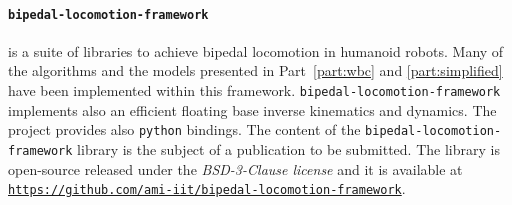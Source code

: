 \paragraph{\texttt{bipedal-locomotion-framework}} is a suite of libraries to achieve bipedal locomotion in humanoid robots. Many of the algorithms and the models presented in Part~\ref{part:wbc} and \ref{part:simplified} have been implemented within this framework. \texttt{bipedal-locomotion-framework} implements also an efficient floating base inverse kinematics and dynamics. The project provides also \texttt{python} bindings. 
The content of the \texttt{bipedal-locomotion-framework} library is the subject of a publication to be submitted. 
The library is open-source released under the \emph{BSD-3-Clause license} and it is available at \href{https://github.com/ami-iit/bipedal-locomotion-framework}{\texttt{https://github.com/ami-iit/bipedal-locomotion-framework}}.
